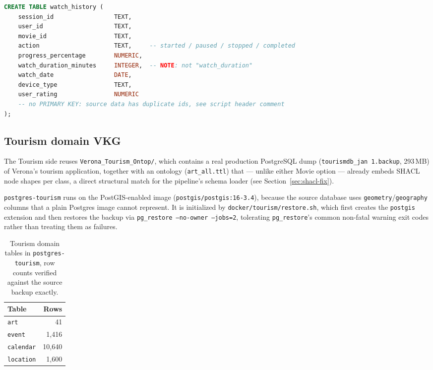 \documentclass[11pt,a4paper]{article}
\newcommand{\code}[1]{\texttt{#1}}
\begin{document}
\begin{lstlisting}[language=SQL, caption={Excerpt of docker/movie/init.sql: the watch\_history
table, whose column naming mismatch with the original OBDA mapping was one of the bugs fixed in
this phase.}]
CREATE TABLE watch_history (
    session_id                 TEXT,
    user_id                    TEXT,
    movie_id                   TEXT,
    action                     TEXT,     -- started / paused / stopped / completed
    progress_percentage        NUMERIC,
    watch_duration_minutes     INTEGER,  -- NOTE: not "watch_duration"
    watch_date                 DATE,
    device_type                TEXT,
    user_rating                NUMERIC
    -- no PRIMARY KEY: source data has duplicate ids, see script header comment
);
\end{lstlisting}

\subsection{Tourism domain VKG}
\label{sec:tourism-vkg}

The Tourism side reuses \code{Verona\_Tourism\_Ontop/}, which contains a real production
PostgreSQL dump (\code{tourismdb\_jan 1.backup}, 293\,MB) of Verona's tourism application,
together with an ontology (\code{art\_all.ttl}) that --- unlike either Movie option --- already
embeds SHACL node shapes per class, a direct structural match for the pipeline's schema loader
(see Section~\ref{sec:shacl-fix}).

\code{postgres-tourism} runs on the PostGIS-enabled image (\code{postgis/postgis:16-3.4}),
because the source database uses \code{geometry}\slash\code{geography} columns that a plain Postgres
image cannot represent. It is initialized by \code{docker/tourism/restore.sh}, which first
creates the \code{postgis} extension and then restores the backup via
\code{pg\_restore --no-owner --jobs=2}, tolerating \code{pg\_restore}'s common non-fatal warning
exit codes rather than treating them as failures.

\begin{table}[H]
\centering
\begin{tabular}{lr}
\toprule
\textbf{Table} & \textbf{Rows} \\
\midrule
\code{art}      & 41 \\
\code{event}    & 1{,}416 \\
\code{calendar} & 10{,}640 \\
\code{location} & 1{,}600 \\
\bottomrule
\end{tabular}
\caption{Tourism domain tables in \code{postgres-tourism}, row counts verified against the
source backup exactly.}
\label{tab:tourism-tables}
\end{table}
\end{document}
